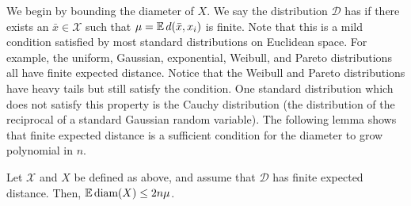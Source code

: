 \documentclass[thesis.tex]{subfiles}
\newcommand{\set}[1]{\mathcal {#1}}
\newcommand{\distribution}[1]{\mathcal {#1}}
\newcommand{\dist}[2]{\distf({#1},{#2})}
\newcommand{\distf}{d}
\newcommand{\diam}[1]{\textnormal{diam}({#1})}
\begin{document}
We begin by bounding the diameter of $X$.
We say the distribution $\distribution D$ has  if there exists an $\bar x\in\set X$ such that $\mu=\E\dist{\bar x}{x_i}$ is finite.
Note that this is a mild condition satisfied by most standard distributions on Euclidean space.
For example, the uniform, Gaussian, exponential, Weibull, and Pareto distributions all have finite expected distance.
Notice that the Weibull and Pareto distributions have heavy tails but still satisfy the condition.
One standard distribution which does not satisfy this property is the Cauchy distribution 
(the distribution of the reciprocal of a standard Gaussian random variable).
The following lemma shows that finite expected distance is a sufficient condition for the diameter to grow polynomial in $n$.

\begin{lemma}
    \label{lemma:Ediam}
    Let $\set X$ and $X$ be defined as above,
    and assume that $\distribution D$ has finite expected distance.
    Then, $\E\diam{X} \le 2n\mu$.
\end{lemma}
\end{document}
